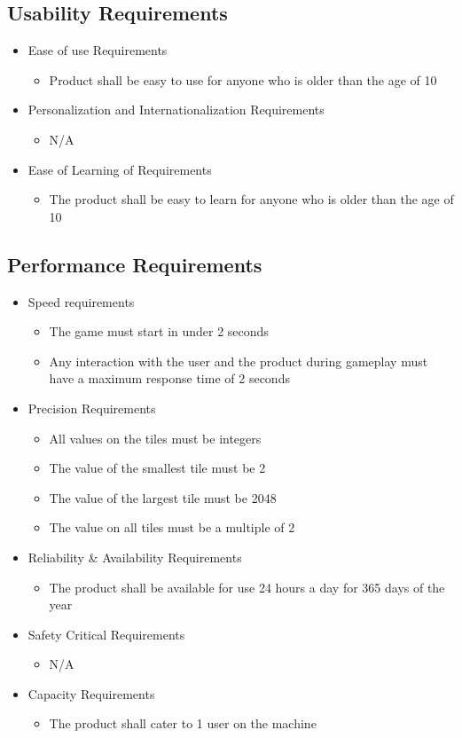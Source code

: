 \subsection{Usability Requirements}
\begin{itemize}
\item Ease of use Requirements
\begin{itemize}
\item Product shall be easy to use for anyone who is older than the age of 10
\end{itemize}
\item Personalization and Internationalization Requirements
\begin{itemize}
\item N/A
\end{itemize}
\item Ease of Learning of Requirements
\begin{itemize}
\item The product shall be easy to learn for anyone who is older than the age of 10
\end{itemize}
\end{itemize}
\subsection{Performance Requirements}
\begin{itemize}
\item Speed requirements
\begin{itemize}
\item The game must start in under 2 seconds
\item Any interaction with the user and the product during gameplay must have a maximum response time of 2 seconds
\end{itemize}

\item{Precision Requirements}
\begin{itemize}
\item All values on the tiles must be integers 
\item The value of the smallest tile must be 2
\item The value of the largest tile must be 2048
\item The value on all tiles must be a multiple of 2
\end{itemize}

\item{Reliability \& Availability Requirements}
\begin{itemize}
\item The product shall be available for use 24 hours a day for 365 days of the year
\end{itemize}
\item{Safety Critical Requirements}
\begin{itemize}
\item N/A
\end{itemize}
\item{Capacity Requirements}
\begin{itemize}
\item The product shall cater to 1 user on the machine
\end{itemize}
\end{itemize}


